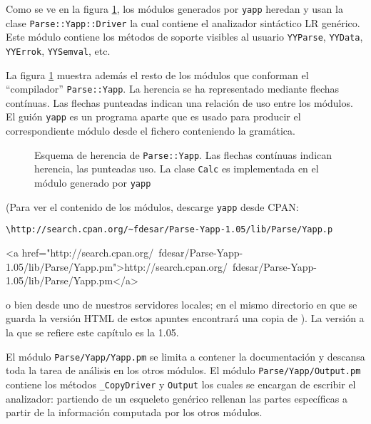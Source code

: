 Como se ve en la figura \ref{fig:yappinheritance}, 
los módulos generados por \verb|yapp|
heredan y usan la clase \verb|Parse::Yapp::Driver|
la  cual contiene el analizador sintáctico LR genérico.
Este módulo contiene los métodos de soporte visibles
al usuario \verb|YYParse|, \verb|YYData|, \verb|YYErrok|, \verb|YYSemval|,
etc.

La figura \ref{fig:yappinheritance} muestra además el 
resto de los módulos
que conforman el ``compilador'' \verb|Parse::Yapp|.
La herencia se ha representado mediante flechas contínuas.
Las flechas punteadas indican una relación de uso entre los módulos.
El guión \verb|yapp| es un programa aparte que es
usado para producir el correspondiente
módulo desde el fichero conteniendo la gramática.

\begin{figure}[htb]
\centerline{}
\caption{Esquema de herencia de {\tt Parse::Yapp}. 
Las flechas contínuas indican herencia, las punteadas uso.
La clase {\tt Calc} es implementada en el módulo generado por {\tt yapp}}
\label{fig:yappinheritance}
\end{figure}

(Para ver el contenido de los módulos, descarge \verb|yapp| desde CPAN:
\begin{latexonly}
\begin{verbatim}
\http://search.cpan.org/~fdesar/Parse-Yapp-1.05/lib/Parse/Yapp.p
\end{verbatim}
\end{latexonly}

\begin{rawhtml}
<a href="http://search.cpan.org/~fdesar/Parse-Yapp-1.05/lib/Parse/Yapp.pm">http://search.cpan.org/~fdesar/Parse-Yapp-1.05/lib/Parse/Yapp.pm</a> 
\end{rawhtml}
o bien desde uno de nuestros servidores locales; en 
el mismo directorio en que se guarda la
versión HTML de estos apuntes encontrará una copia de 
).
La versión a la que se refiere este capítulo es la 1.05.

El módulo \verb|Parse/Yapp/Yapp.pm| se limita a contener la documentación
y descansa toda la tarea de análisis en los otros módulos.
El módulo \verb|Parse/Yapp/Output.pm| contiene los métodos
\verb|_CopyDriver| y \verb|Output| los cuales se encargan de escribir
el analizador: partiendo de un esqueleto genérico rellenan 
las partes específicas a partir de la información computada
por los otros módulos. 

